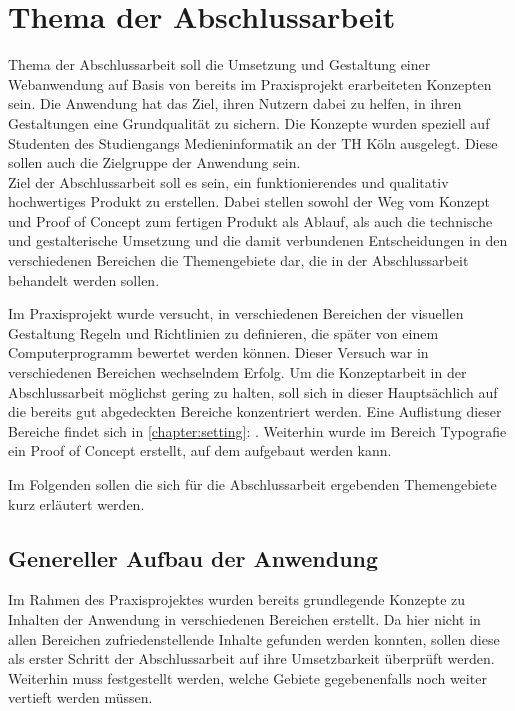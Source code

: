 \section{Thema der Abschlussarbeit}
Thema der Abschlussarbeit soll die Umsetzung und Gestaltung einer Webanwendung auf Basis von bereits im Praxisprojekt erarbeiteten Konzepten sein.
Die Anwendung hat das Ziel, ihren Nutzern dabei zu helfen, in ihren Gestaltungen eine Grundqualität zu sichern. Die Konzepte wurden speziell auf Studenten des Studiengangs Medieninformatik an der TH Köln ausgelegt. Diese sollen auch die Zielgruppe der Anwendung sein. \\
Ziel der Abschlussarbeit soll es sein, ein funktionierendes und qualitativ hochwertiges Produkt zu erstellen.
Dabei stellen sowohl der Weg vom Konzept und Proof of Concept zum fertigen Produkt als Ablauf, als auch die technische und gestalterische Umsetzung und die damit verbundenen Entscheidungen in den verschiedenen Bereichen die Themengebiete dar, die in der Abschlussarbeit behandelt werden sollen.

Im Praxisprojekt wurde versucht, in verschiedenen Bereichen der visuellen Gestaltung Regeln und Richtlinien zu definieren, die später von einem Computerprogramm bewertet werden können. Dieser Versuch war in verschiedenen Bereichen wechselndem Erfolg. Um die Konzeptarbeit in der Abschlussarbeit möglichst gering zu halten, soll sich in dieser Hauptsächlich auf die bereits gut abgedeckten Bereiche konzentriert werden. Eine Auflistung dieser Bereiche findet sich in \autoref{chapter:setting}: \textit{}.
Weiterhin wurde im Bereich Typografie ein Proof of Concept erstellt, auf dem aufgebaut werden kann.

Im Folgenden sollen die sich für die Abschlussarbeit ergebenden Themengebiete kurz erläutert werden.

\subsection{Genereller Aufbau der Anwendung}
\label{chapter:setting}
Im Rahmen des Praxisprojektes wurden bereits grundlegende Konzepte zu Inhalten der Anwendung in verschiedenen Bereichen erstellt. Da hier nicht in allen Bereichen zufriedenstellende Inhalte gefunden werden konnten, sollen diese als erster Schritt der Abschlussarbeit auf ihre Umsetzbarkeit überprüft werden. Weiterhin muss festgestellt werden, welche Gebiete gegebenenfalls noch weiter vertieft werden müssen.

